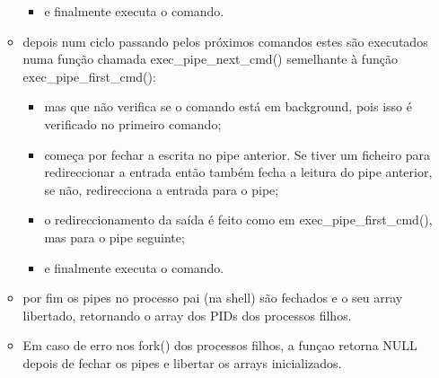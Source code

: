 \documentclass[11pt]{article}
\begin{document}
\begin{itemize}
\begin{itemize}
\begin{itemize}
			\item e finalmente executa o comando.
			
		\end{itemize}
		
		\item depois num ciclo passando pelos próximos comandos estes são executados numa função chamada exec\_pipe\_next\_cmd() semelhante à função exec\_pipe\_first\_cmd():
		
		\begin{itemize}
			
			\item mas que não verifica se o comando está em background, pois isso é verificado no primeiro comando;
			
			\item começa por fechar a escrita no pipe anterior. Se tiver um ficheiro para redireccionar a entrada então também fecha a leitura do pipe anterior, se não, redirecciona a entrada para o pipe;
			
			\item o redireccionamento da saída é feito como em exec\_pipe\_first\_cmd(), mas para o pipe seguinte;
			
			\item e finalmente executa o comando.
			
		\end{itemize}
		
		\item por fim os pipes no processo pai (na shell) são fechados e o seu array libertado, retornando o array dos PIDs dos processos filhos.
		
		\item Em caso de erro nos fork() dos processos filhos, a funçao retorna NULL depois de fechar os pipes e libertar os arrays inicializados.
		
	\end{itemize}

\end{itemize}
\end{document}
